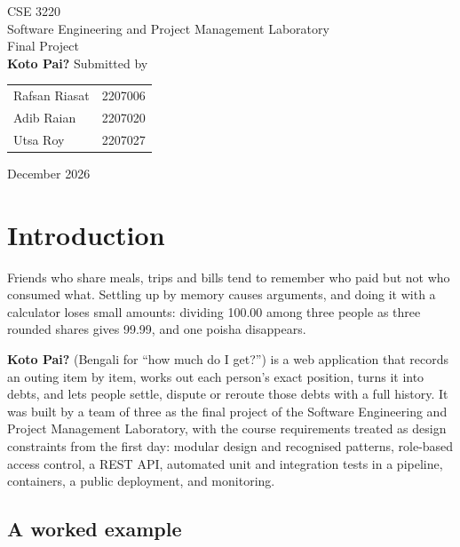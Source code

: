 \documentclass[10pt,a4paper]{article}
\renewcommand{\arraystretch}{1.18}
\begin{document}
\begin{titlepage}
\centering
\vspace*{3.2cm}
{\large CSE 3220}\\[6pt]
{\large Software Engineering and Project Management Laboratory}\\[6pt]
{\large Final Project}\\[3cm]
{\fontsize{40}{46}\selectfont\bfseries Koto Pai?}
\vfill
{\Large Submitted by}\\[16pt]
\renewcommand{\arraystretch}{1.6}
\begin{tabular}{lr}
{\Large Rafsan Riasat} & {\Large 2207006} \\
{\Large Adib Raian}    & {\Large 2207020} \\
{\Large Utsa Roy}      & {\Large 2207027} \\
\end{tabular}
\vfill
{\large December 2026}
\vspace*{1.2cm}
\end{titlepage}

\section{Introduction}

Friends who share meals, trips and bills tend to remember who paid but not who consumed what. Settling up by memory
causes arguments, and doing it with a calculator loses small amounts: dividing 100.00 among three people as three
rounded shares gives 99.99, and one poisha disappears.

\textbf{Koto Pai?} (Bengali for ``how much do I get?'') is a web application that records an outing item by item,
works out each person's exact position, turns it into debts, and lets people settle, dispute or reroute those debts
with a full history. It was built by a team of three as the final project of the Software Engineering and Project
Management Laboratory, with the course requirements treated as design constraints from the first day: modular
design and recognised patterns, role-based access control, a REST API, automated unit and integration tests in a
pipeline, containers, a public deployment, and monitoring.

\subsection{A worked example}
\end{document}
